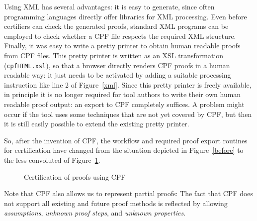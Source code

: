 \documentclass[USenglish]{eptcs}
\newcommand\cime{\textsf{C\kern-0.1ex\textsl{i}ME}\xspace}
\newcommand{\rFI}[1]{Figure~\ref{#1}}
\newcommand\rainbow{\textsf{Rainbow}\xspace}
\newcommand\colorr{\textsf{CoLoR}\xspace}
\newcommand\cocci{\textsf{Coccinelle}\xspace}
\newcommand\isafor{\textsf{Isa\kern-0.2exF\kern-0.2exo\kern-0.2exR}\xspace}
\newcommand\ceta{\textsf{C\kern-0.2exe\kern-0.5exT\kern-0.5exA}\xspace}
\newcommand\colrain{\colorr/\rainbow}
\newcommand\coccime{\cocci/\cime}
\newcommand\isaceta{\isafor/\ceta}
\begin{document}
Using XML has several advantages:
it is easy to generate, since  often programming languages directly offer libraries
for XML processing. Even before certifiers can check the generated proofs, 
standard XML programs can be employed to check whether a CPF file respects the required
XML structure. Finally, it was easy to write a pretty printer to obtain
human readable proofs from CPF files. This pretty printer is written
as an XSL transformation (\texttt{cpfHTML.xsl}), 
so that a browser directly renders CPF proofs in a human readable way:
it just needs to be activated by adding a suitable processing instruction like line 2 of
\rFI{xml}.
Since this pretty printer is freely available,
in principle it is no longer required for tool authors to write their
own human readable proof output: an export to CPF completely suffices. A problem
might occur 
if the tool uses some techniques that are not yet covered by CPF, but then
it is still easily possible to extend the existing pretty printer.

So, after the invention of CPF, the workflow and required proof export
routines for certification have changed from the situation depicted in
\rFI{before} to the less convoluted of \rFI{after}.

\begin{figure}
\centering
{}
\caption{\label{after}Certification of proofs using CPF}
\end{figure}

Note that CPF also allows us to represent partial proofs:
The fact that CPF does not support all existing and future
proof methods is reflected by allowing \emph{assumptions}, \emph{unknown proof steps}, and 
\emph{unknown properties}.
\end{document}
